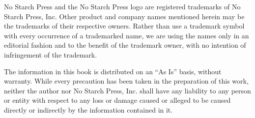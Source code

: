 \begin{copyrightpage}
No Starch Press and the No Starch Press logo are registered trademarks
of No Starch Press, Inc. Other product and company names mentioned
herein may be the trademarks of their respective owners. Rather than
use a trademark symbol with every occurrence of a trademarked name, we
are using the names only in an editorial fashion and to the benefit of
the trademark owner, with no intention of infringement of the
trademark.

The information in this book is distributed on an ``As Is'' basis,
without warranty. While every precaution has been taken in the
preparation of this work, neither the author nor No Starch Press, Inc.
shall have any liability to any person or entity with respect to any
loss or damage caused or alleged to be caused directly or indirectly
by the information contained in it.


\end{copyrightpage}













